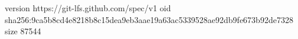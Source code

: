 version https://git-lfs.github.com/spec/v1
oid sha256:9ca5b8cd4e8218b8c15dea9eb3aae19a63ac5339528ae92db9fe673b92de7328
size 87544
